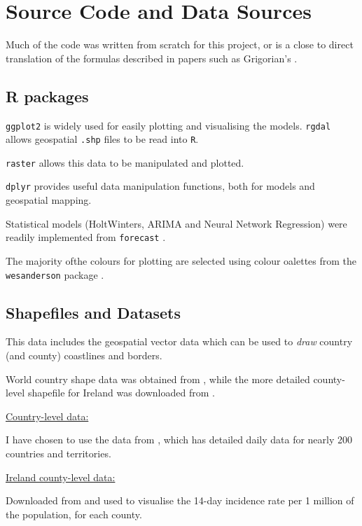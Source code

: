 \section{Source Code and Data Sources}
\label{ch:codesource}

Much of the code was written from scratch for this project, or is a close to direct translation of the formulas described in papers such as Grigorian's \cite{grigor20}.

\subsection{R packages}

\verb|ggplot2|  \cite{ggplot2} is widely used for easily plotting and visualising the models. \verb|rgdal| \cite{rgdal} allows geospatial \verb|.shp| files to be read into \verb|R|. 

\verb|raster| \cite{raster} allows this data to be manipulated and plotted. 

\verb|dplyr| \cite{dplyr}  provides useful data manipulation functions, both for models and geospatial mapping. 

Statistical models (HoltWinters, ARIMA and Neural Network Regression) were readily implemented from \verb|forecast| \cite{forecast}.

The majority ofthe colours for plotting are selected using colour oalettes from the \verb|wesanderson| package \cite{wesanderson20}.

\subsection{Shapefiles and Datasets}

This data includes the geospatial vector data which can be used to \textit{draw} country (and county) coastlines and borders. 

World country shape data was obtained from \cite{countryshape}, while the more detailed county-level shapefile for Ireland was downloaded from \cite{countyshape}.

\underline{Country-level data:}

I have chosen to use the data from  \cite{countrydata}, which has detailed daily data for nearly 200 countries and territories.

\underline{Ireland county-level data:}

Downloaded from \cite{irelanddata} and used to visualise the 14-day incidence rate per 1 million of the population, for each county.

